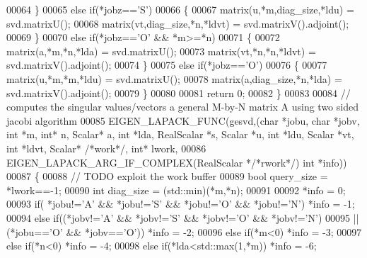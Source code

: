 \begin{DoxyCode}
00064   \}
00065   \textcolor{keywordflow}{else} \textcolor{keywordflow}{if}(*jobz==\textcolor{charliteral}{'S'})
00066   \{
00067     matrix(u,*m,diag\_size,*ldu)   = svd.matrixU();
00068     matrix(vt,diag\_size,*n,*ldvt) = svd.matrixV().adjoint();
00069   \}
00070   \textcolor{keywordflow}{else} \textcolor{keywordflow}{if}(*jobz==\textcolor{charliteral}{'O'} && *m>=*n)
00071   \{
00072     matrix(a,*m,*n,*lda)   = svd.matrixU();
00073     matrix(vt,*n,*n,*ldvt) = svd.matrixV().adjoint();
00074   \}
00075   \textcolor{keywordflow}{else} \textcolor{keywordflow}{if}(*jobz==\textcolor{charliteral}{'O'})
00076   \{
00077     matrix(u,*m,*m,*ldu)        = svd.matrixU();
00078     matrix(a,diag\_size,*n,*lda) = svd.matrixV().adjoint();
00079   \}
00080     
00081   \textcolor{keywordflow}{return} 0;
00082 \}
00083 
00084 \textcolor{comment}{// computes the singular values/vectors a general M-by-N matrix A using two sided jacobi algorithm}
00085 EIGEN\_LAPACK\_FUNC(gesvd,(\textcolor{keywordtype}{char} *jobu, \textcolor{keywordtype}{char} *jobv, \textcolor{keywordtype}{int} *m, \textcolor{keywordtype}{int}* n, Scalar* a, \textcolor{keywordtype}{int} *lda, RealScalar *s, Scalar
       *u, \textcolor{keywordtype}{int} *ldu, Scalar *vt, \textcolor{keywordtype}{int} *ldvt, Scalar* \textcolor{comment}{/*work*/}, \textcolor{keywordtype}{int}* lwork,
00086                          EIGEN\_LAPACK\_ARG\_IF\_COMPLEX(RealScalar *\textcolor{comment}{/*rwork*/}) \textcolor{keywordtype}{int} *info))
00087 \{
00088   \textcolor{comment}{// TODO exploit the work buffer}
00089   \textcolor{keywordtype}{bool} query\_size = *lwork==-1;
00090   \textcolor{keywordtype}{int} diag\_size = (std::min)(*m,*n);
00091   
00092   *info = 0;
00093         \textcolor{keywordflow}{if}( *jobu!=\textcolor{charliteral}{'A'} && *jobu!=\textcolor{charliteral}{'S'} && *jobu!=\textcolor{charliteral}{'O'} && *jobu!=\textcolor{charliteral}{'N'}) *info = -1;
00094   \textcolor{keywordflow}{else}  \textcolor{keywordflow}{if}((*jobv!=\textcolor{charliteral}{'A'} && *jobv!=\textcolor{charliteral}{'S'} && *jobv!=\textcolor{charliteral}{'O'} && *jobv!=\textcolor{charliteral}{'N'})
00095            || (*jobu==\textcolor{charliteral}{'O'} && *jobv==\textcolor{charliteral}{'O'}))                         *info = -2;
00096   \textcolor{keywordflow}{else}  \textcolor{keywordflow}{if}(*m<0)                                                  *info = -3;
00097   \textcolor{keywordflow}{else}  \textcolor{keywordflow}{if}(*n<0)                                                  *info = -4;
00098   \textcolor{keywordflow}{else}  \textcolor{keywordflow}{if}(*lda<std::max(1,*m))                                   *info = -6;

\end{DoxyCode}
